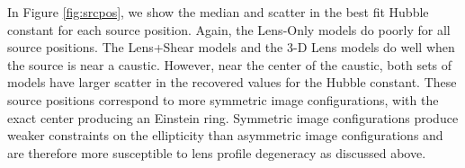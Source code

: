In Figure \ref{fig:srcpos}, we show the median and scatter in the best fit Hubble constant for each source position. Again, the Lens-Only models do poorly for all source positions. The Lens+Shear models and the 3-D Lens models do well when the source is near a caustic. However, near the center of the caustic, both sets of models have larger scatter in the recovered values for the Hubble constant. These source positions correspond to more symmetric image configurations, with the exact center producing an Einstein ring. Symmetric image configurations produce weaker constraints on the ellipticity than asymmetric image configurations and are therefore more susceptible to lens profile degeneracy as discussed above.
